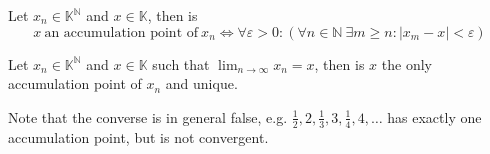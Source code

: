 

\begin{theorem}
   Let \(x_n \in \mathbb{K}^\mathbb{N}\) and \(x \in \mathbb{K}\), then is
   \[x~\text{an accumulation point of}~x_n \iff \forall \varepsilon > 0: (\forall n \in \mathbb{N}~\exists m \geq n: |x_m - x| < \varepsilon)\]
\end{theorem}

\begin{theorem}
   Let \(x_n \in \mathbb{K}^\mathbb{N}\) and \(x \in \mathbb{K}\) such that \(\lim_{n \to \infty} x_n = x\), then is \(x\) the only accumulation point of \(x_n\) and unique.
\end{theorem}
\begin{remark}
   Note that the converse is in general false, e.g. \(\frac{1}{2}, 2, \frac{1}{3}, 3, \frac{1}{4}, 4, \ldots\) has exactly one accumulation point, but is not convergent.
\end{remark}

